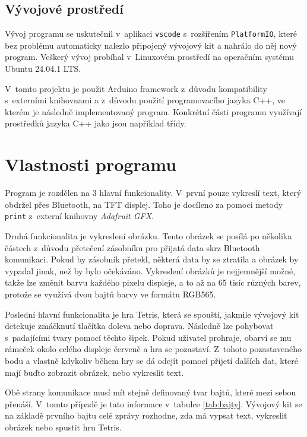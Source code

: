 \section{Vývojové prostředí}

Vývoj programu se uskutečnil v~aplikaci \texttt{vscode} s~rozšířením \texttt{PlatformIO}, které bez problému automaticky nalezlo připojený vývojový kit a nahrálo do něj nový program. Veškerý vývoj probíhal v~Linuxovém prostředí na operačním systému Ubuntu 24.04.1 LTS.

V~tomto projektu je použit Arduino framework z~důvodu kompatibility s~externími knihovnami a z~důvodu použití programovacího jazyka C++, ve kterém je následně implementovaný program. Konkrétní části programu využívají prostředků jazyka C++ jako jsou například třídy.

\chapter{Vlastnosti programu}

Program je rozdělen na 3 hlavní funkcionality. V~první pouze vykreslí text, který obdržel přes Bluetooth, na TFT displej. Toho je docíleno za pomoci metody \texttt{print} z~externí knihovny \textit{Adafruit GFX}.

Druhá funkcionalita je vykreslení obrázku. Tento obrázek se posílá po několika částech z~důvodu přetečení zásobníku pro přijatá data skrz Bluetooth komunikaci. Pokud by zásobník přetekl, některá data by se ztratila a obrázek by vypadal jinak, než by bylo očekáváno. Vykreslení obrázků je nejjemnější možné, takže lze změnit barvu každého pixelu displeje, a to až na 65 tisíc různých barev, protože se využívá dvou bajtů barvy ve formátu RGB565.

Poslední hlavní funkcionalita je hra Tetris, která se spouští, jakmile vývojový kit detekuje zmáčknutí tlačítka doleva nebo doprava. Následně lze pohybovat s~padajícími tvary pomocí těchto šipek. Pokud uživatel prohraje, obarví se mu rámeček okolo celého displeje červeně a hra se pozastaví. Z~tohoto pozastaveného bodu a vlastně kdykoliv během hry se dá odejít pomocí přijetí dalších dat, které mají buďto zobrazit obrázek, nebo vykreslit text.

Obě strany komunikace musí mít stejně definovaný tvar bajtů, které mezi sebou přenáší. V~tomto případě je tato informace v~tabulce \ref{tab:bajty}. Vývojový kit se na základě prvního bajtu celé zprávy rozhodne, zda má vypsat text, vykreslit obrázek nebo spustit hru Tetris.

